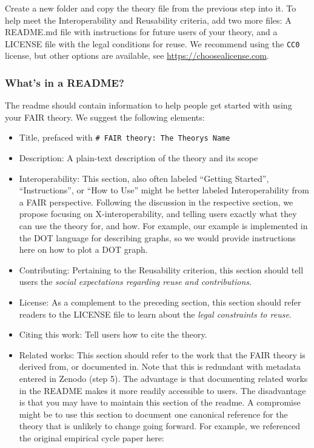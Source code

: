 \documentclass[
  man,floatsintext]{apa6}
\providecommand{\tightlist}{%
  \setlength{\itemsep}{0pt}\setlength{\parskip}{0pt}}
\begin{document}
Create a new folder and copy the theory file from the previous step into it.
To help meet the Interoperability and Reusability criteria,
add two more files:
A README.md file with instructions for future users of your theory,
and a LICENSE file with the legal conditions for reuse.
We recommend using the \texttt{CC0} license, but other options are available, see \href{https://choosealicense.com/non-software/}{https://choosealicense.com}.

\subsubsection{What's in a README?}\label{whats-in-a-readme}

The readme should contain information to help people get started with using your FAIR theory.
We suggest the following elements:

\begin{itemize}
\tightlist
\item
  Title, prefaced with \texttt{\#\ FAIR\ theory:\ The\ Theory\textquotesingle{}s\ Name}
\item
  Description: A plain-text description of the theory and its scope
\item
  Interoperability: This section, also often labeled ``Getting Started'', ``Instructions'', or ``How to Use'' might be better labeled Interoperability from a FAIR perspective. Following the discussion in the respective section, we propose focusing on X-interoperability, and telling users exactly what they can use the theory for, and how. For example, our example is implemented in the DOT language for describing graphs, so we would provide instructions here on how to plot a DOT graph.
\item
  Contributing: Pertaining to the Reusability criterion, this section should tell users the \emph{social expectations regarding reuse and contributions}.
\item
  License: As a complement to the preceding section, this section should refer readers to the LICENSE file to learn about the \emph{legal constraints to reuse}.
\item
  Citing this work: Tell users how to cite the theory.
\item
  Related works: This section should refer to the work that the FAIR theory is derived from, or documented in. Note that this is redundant with metadata entered in Zenodo (step 5). The advantage is that documenting related works in the README makes it more readily accessible to users. The disadvantage is that you may have to maintain this section of the readme. A compromise might be to use this section to document one canonical reference for the theory that is unlikely to change going forward. For example, we referenced the original empirical cycle paper here:
\end{itemize}
\end{document}
